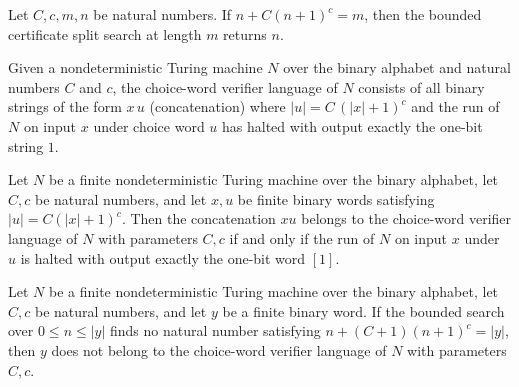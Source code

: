 \begin{lemma}
\label{Complexity.certificateSplit_complete}
\leanok
{}
Let $C,c,m,n$ be natural numbers. If $n+C(n+1)^c=m$, then the bounded certificate split
search at length $m$ returns $n$.
\end{lemma}

\begin{definition}
\label{Complexity.choiceVerifier}
\leanok
{}
Given a nondeterministic Turing machine $N$ over the binary alphabet and natural numbers $C$ and $c$, the choice-word verifier language of $N$ consists of all binary strings of the form $x\,u$ (concatenation) where $|u| = C\,(|x|+1)^c$ and the run of $N$ on input $x$ under choice word $u$ has halted with output exactly the one-bit string $1$.
\end{definition}

\begin{lemma}
\label{Complexity.choiceVerifier_append}
\leanok
{}
Let $N$ be a finite nondeterministic Turing machine over the binary alphabet, let $C,c$
be natural numbers, and let $x,u$ be finite binary words satisfying $|u|=C(|x|+1)^c$.
Then the concatenation $xu$ belongs to the choice-word verifier language of $N$ with
parameters $C,c$ if and only if the run of $N$ on input $x$ under $u$ is halted with
output exactly the one-bit word $[1]$.
\end{lemma}

\begin{lemma}
\label{Complexity.choiceVerifier_no_split}
\leanok
{}
Let $N$ be a finite nondeterministic Turing machine over the binary alphabet, let $C,c$
be natural numbers, and let $y$ be a finite binary word. If the bounded search over
$0\le n\le |y|$ finds no natural number satisfying $n+(C+1)(n+1)^c=|y|$, then $y$ does
not belong to the choice-word verifier language of $N$ with parameters $C,c$.
\end{lemma}

